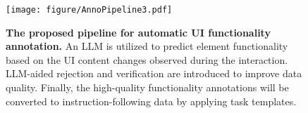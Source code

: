 \begin{figure}[t]
    \centering
    \texttt{[image: figure/AnnoPipeline3.pdf]}
    \caption{\textbf{The proposed pipeline for automatic UI functionality annotation.} An LLM is utilized to predict element functionality based on the UI content changes observed during the interaction. LLM-aided rejection and verification are introduced to improve data quality. Finally, the high-quality functionality annotations will be converted to instruction-following data by applying task templates.}
    \label{fig: anno pipeline}
\end{figure}
